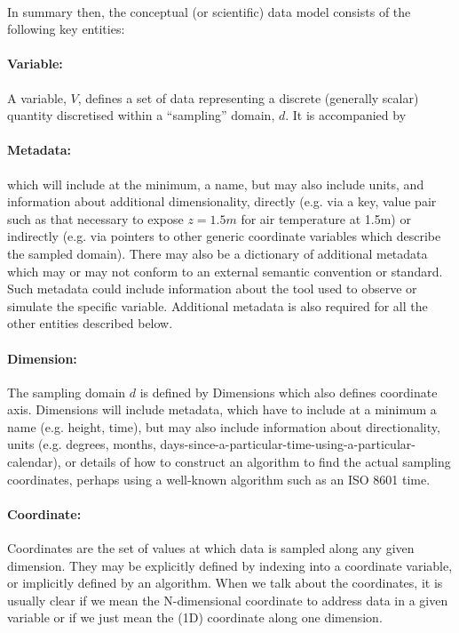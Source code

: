 \paragraph{}In summary then, the conceptual (or scientific) data model consists of the following key entities:

\paragraph {Variable:} A variable, $V$, defines a set of data representing a discrete (generally scalar) quantity discretised within a ``sampling'' domain, $d$.  It is accompanied by

\paragraph {Metadata:} which will include at the minimum, a name, but may also include units, and information about additional dimensionality, directly (e.g. via a key, value pair such as that necessary to expose $z=1.5m$ for air temperature at 1.5m) or indirectly (e.g. via pointers to other generic coordinate variables which describe the sampled domain).   There may also be a dictionary of additional metadata which may or may not conform to an external semantic convention or standard.  Such metadata could include information about the tool used to observe or simulate the specific variable.  Additional metadata is also required for all the other entities described below.

\paragraph{Dimension:} The sampling domain $d$ is defined by Dimensions which also defines coordinate axis. Dimensions will include metadata, which have to include at a minimum a name (e.g. height, time), but may also include information about directionality, units (e.g. degrees, months, days-since-a-particular-time-using-a-particular-calendar), or details of how to construct an algorithm to find the actual sampling coordinates, perhaps using a well-known algorithm such as an ISO 8601 time.

\paragraph{Coordinate:} Coordinates  are the set of values at which data is sampled along any given dimension. They may be
explicitly defined by indexing into a coordinate variable, or implicitly defined by an algorithm. When we talk about the coordinates, it is usually clear if we mean the N-dimensional coordinate to address data in a given variable or if we just mean the (1D) coordinate along one dimension.


